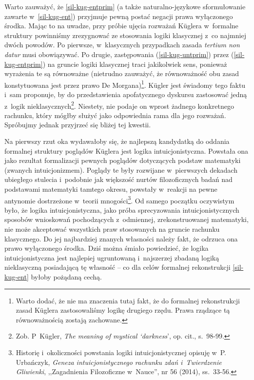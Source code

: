 Warto zauważyć, że \ref{sil-kug-entprim} (a także naturalno-językowe sformułowanie zawarte w~\ref{sil-kug-ent}) przyjmuje pewną postać negacji prawa wyłączonego środka. Mając to na uwadze, przy próbie ujęcia rozważań Küglera w~formalne struktury powinniśmy zrezygnować ze stosowania logiki klasycznej z~co najmniej dwóch powodów. Po pierwsze, w~klasycznych przypadkach zasada \textit{tertium non datur} musi obowiązywać. Po drugie, zastępowania (\ref{sil-kug-untprim}) przez (\ref{sil-kug-entprim}) na gruncie logiki klasycznej traci jakikolwiek sens, ponieważ wyrażenia te są równoważne (nietrudno zauważyć, że równoważność obu zasad konstytuowana jest przez prawo De Morgana)\footnote{Warto dodać, że nie ma znaczenia tutaj fakt, że do formalnej rekonstrukcji zasad Küglera zastosowaliśmy logikę drugiego rzędu. Prawa rządzące tą równoważnością zostają zachowane.}. Kügler jest świadomy tego faktu i~sam proponuje, by do przedstawienia apofatycznego dyskursu zastosować jedną z~logik nieklasycznych\footnote{Zob. P~Kügler, \textit{The meaning of mystical ‘darkness}', op. cit., s.~98-99.}. Niestety, nie podaje on wprost żadnego konkretnego rachunku, który mógłby służyć jako odpowiednia rama dla jego rozważań. Spróbujmy jednak przyjrzeć się bliżej tej kwestii.

Na pierwszy rzut oka wydawałoby się, że najlepszą kandydatką do oddania formalnej struktury poglądów Küglera jest logika intuicjonistyczna. Powstała ona jako rezultat formalizacji pewnych poglądów dotyczących podstaw matematyki (zwanych intuicjonizmem). Poglądy te były rozwijane w~pierwszych dekadach ubiegłego stulecia i~podobnie jak większość nurtów filozoficznych badań nad podstawami matematyki tamtego okresu, powstały w~reakcji na pewne antynomie dostrzeżone w~teorii mnogości\footnote{Historię i~okoliczności powstania logiki intuicjonistycznej opisuję w~P. Urbańczyk, \textit{Geneza intuicjonistycznego rachunku zdań i~Twierdzenie Gliwienki}, ,,Zagadnienia Filozoficzne w~Nauce'', nr 56 (2014), ss.~33-56.}. Od samego początku oczywistym było, że logika intuicjonistyczna, jako próba sprecyzowania intuicjonistycznych sposobów wnioskowań pochodzących z~odmiennej, zrekonstruowanej matematyki, nie może akceptować wszystkich praw stosowanych na gruncie rachunku klasycznego. Do jej najbardziej znanych własności należy fakt, że odrzuca ona prawo wyłączonego środka. Dziś można śmiało powiedzieć, że logika intuicjonistyczna jest najlepiej ugruntowaną i~najszerzej zbadaną logiką nieklasyczną posiadającą tę własność -- co dla celów formalnej rekonstrukcji \ref{sil-kug-ent} byłoby pożądaną cechą.

